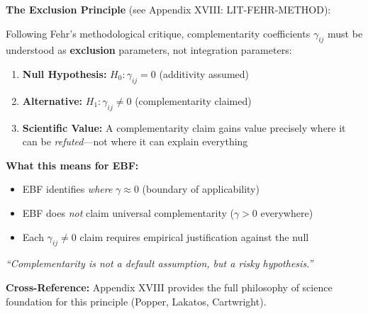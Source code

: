\begin{tcolorbox}[colback=red!5!white, colframe=red!75!black,
    title=\textbf{Methodological Principle: $\gamma = 0$ as Null Hypothesis}]

\textbf{The Exclusion Principle} (see Appendix XVIII: LIT-FEHR-METHOD):

Following Fehr's methodological critique, complementarity coefficients $\gamma_{ij}$
must be understood as \textbf{exclusion} parameters, not integration parameters:

\begin{enumerate}[noitemsep]
    \item \textbf{Null Hypothesis:} $H_0: \gamma_{ij} = 0$ (additivity assumed)
    \item \textbf{Alternative:} $H_1: \gamma_{ij} \neq 0$ (complementarity claimed)
    \item \textbf{Scientific Value:} A complementarity claim gains value precisely
          where it can be \textit{refuted}---not where it can explain everything
\end{enumerate}

\textbf{What this means for EBF:}
\begin{itemize}[noitemsep]
    \item EBF identifies \textit{where} $\gamma \approx 0$ (boundary of applicability)
    \item EBF does \textit{not} claim universal complementarity ($\gamma > 0$ everywhere)
    \item Each $\gamma_{ij} \neq 0$ claim requires empirical justification against the null
\end{itemize}

\textit{``Complementarity is not a default assumption, but a risky hypothesis.''}

\textbf{Cross-Reference:} Appendix XVIII provides the full philosophy of science
foundation for this principle (Popper, Lakatos, Cartwright).

\end{tcolorbox}



